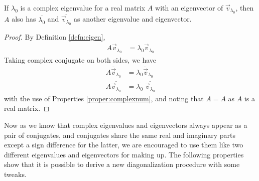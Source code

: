 \begin{proper}
\label{proper:eigenconj}
If $\lambda_0$ is a complex eigenvalue for a real matrix $A$ with an eigenvector of $\vec{v}_{\lambda_0}$, then $A$ also has $\overline{\lambda_0}$ and $\overline{\vec{v}_{\lambda_0}}$ as another eigenvalue and eigenvector.
\end{proper}
\begin{proof}
By Definition \ref{defn:eigen},
\begin{align*}
A\vec{v}_{\lambda_0} &= \lambda_0\vec{v}_{\lambda_0}    
\end{align*}
Taking complex conjugate on both sides, we have
\begin{align*}
\overline{A\vec{v}_{\lambda_0}} &= \overline{\lambda_0\vec{v}_{\lambda_0}} \\
A \overline{\vec{v}_{\lambda_0}} &= \overline{\lambda_0}\; \overline{\vec{v}_{\lambda_0}}
\end{align*}
with the use of Properties \ref{proper:complexnum}, and noting that $\overline{A} = A$ as $A$ is a real matrix.
\end{proof}
Now as we know that complex eigenvalues and eigenvectors always appear as a pair of  conjugates, and conjugates share the same real and imaginary parts except a sign difference for the latter, we are encouraged to use them like two different eigenvalues and eigenvectors for making up. The following properties show that it is possible to derive a new diagonalization procedure with some tweaks.

